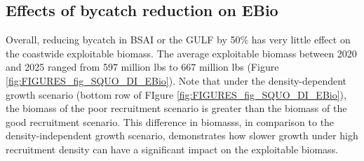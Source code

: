 \subsection{Effects of bycatch reduction on EBio} %
Overall, reducing bycatch in BSAI or the GULF by 50\% has very little effect on the coastwide exploitable biomass.  The average exploitable biomass between 2020 and 2025 ranged from 597 million lbs to 667 million lbs (Figure \ref{fig:FIGURES_fig_SQUO_DI_EBio}).  Note that under the density-dependent growth scenario (bottom row of FIgure \ref{fig:FIGURES_fig_SQUO_DI_EBio}), the biomass of the poor recruitment scenario is greater than the biomass of the good recruitment scenario.   This difference in biomasss, in comparison to the density-independent growth scenario, demonstrates how slower growth under high recruitment density can have a significant impact on the exploitable biomass.

